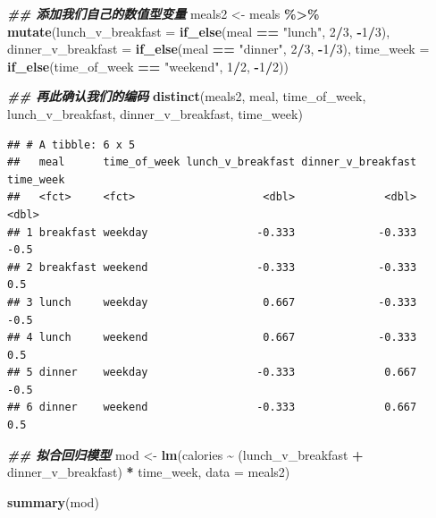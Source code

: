 \documentclass[
]{book}
\newenvironment{Shaded}{\begin{snugshade}}{\end{snugshade}}
\newcommand{\AttributeTok}[1]{\textcolor[rgb]{0.13,0.29,0.53}{#1}}
\newcommand{\DecValTok}[1]{\textcolor[rgb]{0.00,0.00,0.81}{#1}}
\newcommand{\DocumentationTok}[1]{\textcolor[rgb]{0.56,0.35,0.01}{\textbf{\textit{#1}}}}
\newcommand{\FunctionTok}[1]{\textcolor[rgb]{0.13,0.29,0.53}{\textbf{#1}}}
\newcommand{\NormalTok}[1]{#1}
\newcommand{\OtherTok}[1]{\textcolor[rgb]{0.56,0.35,0.01}{#1}}
\newcommand{\SpecialCharTok}[1]{\textcolor[rgb]{0.81,0.36,0.00}{\textbf{#1}}}
\newcommand{\StringTok}[1]{\textcolor[rgb]{0.31,0.60,0.02}{#1}}
\begin{document}
\begin{Shaded}
\begin{Highlighting}[]
\DocumentationTok{\#\# 添加我们自己的数值型变量}
\NormalTok{meals2 }\OtherTok{\textless{}{-}}\NormalTok{ meals }\SpecialCharTok{\%\textgreater{}\%}
  \FunctionTok{mutate}\NormalTok{(}\AttributeTok{lunch\_v\_breakfast =} \FunctionTok{if\_else}\NormalTok{(meal }\SpecialCharTok{==} \StringTok{"lunch"}\NormalTok{, }\DecValTok{2}\SpecialCharTok{/}\DecValTok{3}\NormalTok{, }\SpecialCharTok{{-}}\DecValTok{1}\SpecialCharTok{/}\DecValTok{3}\NormalTok{),}
         \AttributeTok{dinner\_v\_breakfast =} \FunctionTok{if\_else}\NormalTok{(meal }\SpecialCharTok{==} \StringTok{"dinner"}\NormalTok{, }\DecValTok{2}\SpecialCharTok{/}\DecValTok{3}\NormalTok{, }\SpecialCharTok{{-}}\DecValTok{1}\SpecialCharTok{/}\DecValTok{3}\NormalTok{),}
         \AttributeTok{time\_week =} \FunctionTok{if\_else}\NormalTok{(time\_of\_week }\SpecialCharTok{==} \StringTok{"weekend"}\NormalTok{, }\DecValTok{1}\SpecialCharTok{/}\DecValTok{2}\NormalTok{, }\SpecialCharTok{{-}}\DecValTok{1}\SpecialCharTok{/}\DecValTok{2}\NormalTok{))}

\DocumentationTok{\#\# 再此确认我们的编码}
\FunctionTok{distinct}\NormalTok{(meals2, meal, time\_of\_week,}
\NormalTok{         lunch\_v\_breakfast, dinner\_v\_breakfast, time\_week)}
\end{Highlighting}
\end{Shaded}

\begin{verbatim}
## # A tibble: 6 x 5
##   meal      time_of_week lunch_v_breakfast dinner_v_breakfast time_week
##   <fct>     <fct>                    <dbl>              <dbl>     <dbl>
## 1 breakfast weekday                 -0.333             -0.333      -0.5
## 2 breakfast weekend                 -0.333             -0.333       0.5
## 3 lunch     weekday                  0.667             -0.333      -0.5
## 4 lunch     weekend                  0.667             -0.333       0.5
## 5 dinner    weekday                 -0.333              0.667      -0.5
## 6 dinner    weekend                 -0.333              0.667       0.5
\end{verbatim}

\begin{Shaded}
\begin{Highlighting}[]
\DocumentationTok{\#\# 拟合回归模型}
\NormalTok{mod }\OtherTok{\textless{}{-}} \FunctionTok{lm}\NormalTok{(calories }\SpecialCharTok{\textasciitilde{}}\NormalTok{ (lunch\_v\_breakfast }\SpecialCharTok{+}\NormalTok{ dinner\_v\_breakfast) }\SpecialCharTok{*}
\NormalTok{            time\_week, }\AttributeTok{data =}\NormalTok{ meals2)}

\FunctionTok{summary}\NormalTok{(mod)}
\end{Highlighting}
\end{Shaded}
\end{document}
